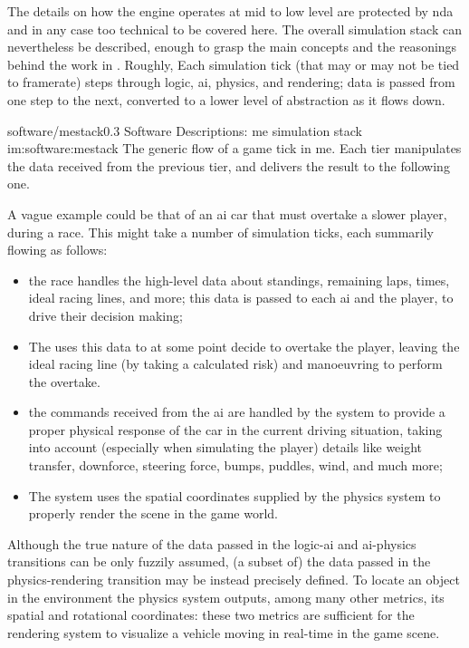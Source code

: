 The details on how the engine operates at mid to low level are protected by \gls{nda} and in any case too technical to be covered here. The overall simulation stack can nevertheless be described, enough to grasp the main concepts and the reasonings behind the work in . Roughly, Each simulation tick (that may or may not be tied to framerate) steps through logic, \gls{ai}, physics, and rendering; data is passed from one step to the next, converted to a lower level of abstraction as it flows down.

\begin{image}
	{software/mestack}{0.3}
	{Software Descriptions: \gls{me} simulation stack}
	{im:software:mestack}
	{}
	{The generic flow of a game tick in \gls{me}. Each tier manipulates the data received from the previous tier, and delivers the result to the following one.}
\end{image}

A vague example could be that of an \gls{ai} car that must overtake a slower player, during a race. This might take a number of simulation ticks, each summarily flowing as follows:

\begin{itemize}
	\item the race  handles the high-level data about standings, remaining laps, times, ideal racing lines, and more; this data is passed to each \gls{ai} and the player, to drive their decision making;
	\item The  uses this data to at some point decide to overtake the player, leaving the ideal racing line (by taking a calculated risk) and manoeuvring to perform the overtake.
	\item the commands received from the \gls{ai} are handled by the  system to provide a proper physical response of the car in the current driving situation, taking into account (especially when simulating the player) details like weight transfer, downforce, steering force, bumps, puddles, wind, and much more;
	\item The  system uses the spatial coordinates supplied by the physics system to properly render the scene in the game world.
\end{itemize}

Although the true nature of the data passed in the logic-\gls{ai} and \gls{ai}-physics transitions can be only fuzzily assumed, (a subset of) the data passed in the physics-rendering transition may be instead precisely defined. To locate an object in the environment the physics system outputs, among many other metrics, its spatial and rotational coordinates: these two metrics are sufficient for the rendering system to visualize a vehicle moving in real-time in the game scene.


